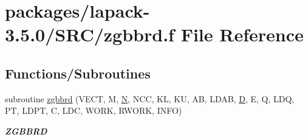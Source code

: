 \hypertarget{zgbbrd_8f}{}\section{packages/lapack-\/3.5.0/\+S\+R\+C/zgbbrd.f File Reference}
\label{zgbbrd_8f}
\subsection*{Functions/\+Subroutines}
\begin{DoxyCompactItemize}
\item 
subroutine \hyperlink{group__complex16GBcomputational_ga00a48689a70d8648e27d282870bd58bf}{zgbbrd} (V\+E\+C\+T, M, \hyperlink{polmisc_8c_a0240ac851181b84ac374872dc5434ee4}{N}, N\+C\+C, K\+L, K\+U, A\+B, L\+D\+A\+B, \hyperlink{odrpack_8h_a7dae6ea403d00f3687f24a874e67d139}{D}, E, Q, L\+D\+Q, P\+T, L\+D\+P\+T, C, L\+D\+C, W\+O\+R\+K, R\+W\+O\+R\+K, I\+N\+F\+O)
\begin{DoxyCompactList}\small\item\em {\bfseries Z\+G\+B\+B\+R\+D} \end{DoxyCompactList}\end{DoxyCompactItemize}
